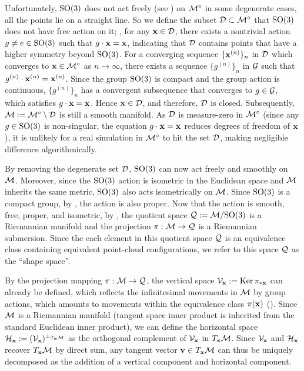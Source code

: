 Unfortunately, $\mathrm{SO}(3)$ does not act freely (see ) on $\mathcal{M}^\circ$ in some degenerate cases, \eg all the points lie on a straight line. So we define the subset $\mathcal{D}\subset\mathcal{M}^\circ$ that $\mathrm{SO}(3)$ does not have free action on it; \ie, for any $\mathbf{x} \in \mathcal{D}$, there exists a nontrivial action $g \ne e \in \mathrm{SO}(3)$ such that $g \cdot \mathbf{x} = \mathbf{x}$, indicating that $\mathcal{D}$ contains points that have a higher symmetry beyond $\mathrm{SO}(3)$.
For a converging sequence $\{\mathbf{x}^{(n)}\}_n$ in $\mathcal{D}$ which converges to $\mathbf{x} \in \mathcal{M}^\circ$ as $n \to \infty$, there exists a sequence $\{g^{(n)}\}_n$ in $\mathcal{G}$ such that $g^{(n)} \cdot \mathbf{x}^{(n)} = \mathbf{x}^{(n)}$. Since the group $\mathrm{SO}(3)$ is compact and the group action is continuous, $\{g^{(n)}\}_n$ has a convergent subsequence that converges to $g\in\mathcal{G}$, which satisfies $g\cdot\mathbf{x}=\mathbf{x}$. Hence $\mathbf{x}\in\mathcal{D}$, and therefore, $\mathcal{D}$ is closed.
Subsequently, $\mathcal{M} := \mathcal{M}^\circ\setminus\mathcal{D}$ is still a smooth manifold.
As $\mathcal{D}$ is measure-zero in $\mathcal{M}^\circ$ (since any $g \in \mathrm{SO}(3)$ is non-singular, the equation $g \cdot \mathbf{x} = \mathbf{x}$ reduces degrees of freedom of $\mathbf{x}$), it is unlikely for a real simulation in $\mathcal{M}^\circ$ to hit the set $\mathcal{D}$, making negligible difference algorithmically.

By removing the degenerate set $\mathcal{D}$, $\mathrm{SO}(3)$ can now act freely and smoothly on $\mathcal{M}$.
Moreover, since the $\mathrm{SO}(3)$ action is isometric in the Euclidean space and $\mathcal{M}$ inherits the same metric, $\mathrm{SO}(3)$ also acts isometrically on $\mathcal{M}$. Since $\mathrm{SO}(3)$ is a compact group, by , the action is also proper.
Now that the action is smooth, free, proper, and isometric, by , the quotient space $\mathcal{Q} := \mathcal{M}/\mathrm{SO}(3)$ is a Riemannian manifold and the projection $\pi:\mathcal{M}\to\mathcal{Q}$ is a Riemannian submersion.
Since the each element in this quotient space $\mathcal{Q}$ is an equivalence class containing equivalent point-cloud configurations, we refer to this space $\mathcal{Q}$ as the ``shape space''.

By the projection mapping $\pi: \mathcal{M} \to \mathcal{Q}$, the vertical space $\mathcal{V}_{\mathbf{x}} := \mathrm{Ker}\, \pi_{*\mathbf{x}}$ can already be defined, which reflects the infinitesimal movements in $\mathcal{M}$ by group actions, which amounts to movements within the equivalence class $\pi(\mathbf{x})$ ().
Since $\mathcal{M}$ is a Riemannian manifold (tangent space inner product is inherited from the standard Euclidean inner product), we can define the horizontal space $\mathcal{H}_{\mathbf{x}} := (\mathcal{V}_{\mathbf{x}})^{\perp_{T_{\mathbf{x}} \mathcal{M}}}$ as the orthogonal complement of $\mathcal{V}_{\mathbf{x}}$ in $T_{\mathbf{x}} \mathcal{M}$. Since $\mathcal{V}_{\mathbf{x}}$ and $\mathcal{H}_{\mathbf{x}}$ recover $T_{\mathbf{x}} \mathcal{M}$ by direct sum, any tangent vector $\mathbf{v} \in T_{\mathbf{x}} \mathcal{M}$ can thus be uniquely decomposed as the addition of a vertical component and horizontal component.

